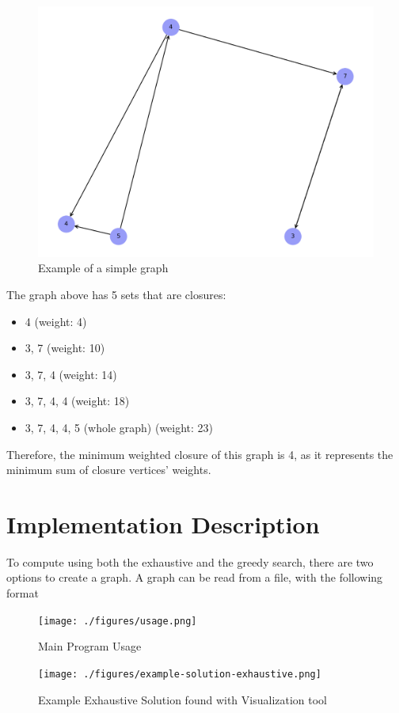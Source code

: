 \documentclass[...]{revdetua}
\begin{document}
\begin{figure}[!htb]
    \centering
    \includegraphics[width=0.8\columnwidth]{./figures/simple_graph.png}
    \caption{Example of a simple graph}
    \label{fig:Cloud Computing Types}
\end{figure}

The graph above has 5 sets that are closures:

\begin{itemize}
    \item 4 (weight: 4)
    \item 3, 7 (weight: 10)
    \item 3, 7, 4 (weight: 14)
    \item 3, 7, 4, 4 (weight: 18)
    \item 3, 7, 4, 4, 5 (whole graph) (weight: 23)
\end{itemize}

Therefore, the minimum weighted closure of this graph is 4, as it represents the minimum sum of closure vertices' weights.

\section{ Implementation Description}

To compute using both the exhaustive and the greedy search, there are two options to create a graph. A graph can be read from a file, with the following format

\begin{figure}[!htb]
    \centering
    \texttt{[image: ./figures/usage.png]}
    \caption{Main Program Usage}
    \label{fig:Program Usage}
\end{figure}


\begin{figure}[!htb]
    \centering
    \texttt{[image: ./figures/example-solution-exhaustive.png]}
    \caption{Example Exhaustive Solution found with Visualization tool}
    \label{fig: Example Solution}
\end{figure}
\end{document}
